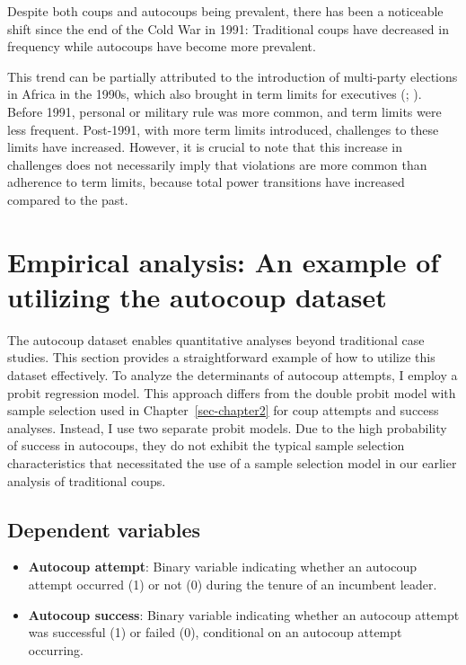 \documentclass[
  12pt,
]{report}
\begin{document}
Despite both coups and autocoups being prevalent, there has been a
noticeable shift since the end of the Cold War in 1991: Traditional
coups have decreased in frequency while autocoups have become more
prevalent.

This trend can be partially attributed to the introduction of
multi-party elections in Africa in the 1990s, which also brought in term
limits for executives (;
). Before 1991, personal or
military rule was more common, and term limits were less frequent.
Post-1991, with more term limits introduced, challenges to these limits
have increased. However, it is crucial to note that this increase in
challenges does not necessarily imply that violations are more common
than adherence to term limits, because total power transitions have
increased compared to the past.

\section{Empirical analysis: An example of utilizing the autocoup
dataset}\label{empirical-analysis-an-example-of-utilizing-the-autocoup-dataset}

The autocoup dataset enables quantitative analyses beyond traditional
case studies. This section provides a straightforward example of how to
utilize this dataset effectively. To analyze the determinants of
autocoup attempts, I employ a probit regression model. This approach
differs from the double probit model with sample selection used in
Chapter~\ref{sec-chapter2} for coup attempts and success analyses.
Instead, I use two separate probit models. Due to the high probability
of success in autocoups, they do not exhibit the typical sample
selection characteristics that necessitated the use of a sample
selection model in our earlier analysis of traditional coups.

\subsection{Dependent variables}\label{dependent-variables}

\begin{itemize}
\item
  \textbf{Autocoup attempt}: Binary variable indicating whether an
  autocoup attempt occurred (1) or not (0) during the tenure of an
  incumbent leader.
\item
  \textbf{Autocoup success}: Binary variable indicating whether an
  autocoup attempt was successful (1) or failed (0), conditional on an
  autocoup attempt occurring.
\end{itemize}
\end{document}
